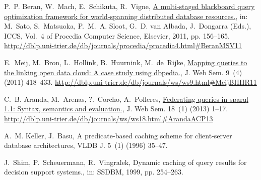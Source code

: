 \documentclass{article}
\begin{document}
\begin{thebibliography}{10}
P.~P. Beran, W.~Mach, E.~Schikuta, R.~Vigne,
  \href{http://dblp.uni-trier.de/db/journals/procedia/procedia4.html\#BeranMSV11}{A
  multi-staged blackboard query optimization framework for world-spanning
  distributed database resources.}, in: M.~Sato, S.~Matsuoka, P.~M.~A. Sloot,
  G.~D. van Albada, J.~Dongarra (Eds.), ICCS, Vol.~4 of Procedia Computer
  Science, Elsevier, 2011, pp. 156--165.
\newline\urlprefix\url{http://dblp.uni-trier.de/db/journals/procedia/procedia4.html\#BeranMSV11}

E.~Meij, M.~Bron, L.~Hollink, B.~Huurnink, M.~de~Rijke,
  \href{http://dblp.uni-trier.de/db/journals/ws/ws9.html\#MeijBHHR11}{Mapping
  queries to the linking open data cloud: A case study using dbpedia.}, J. Web
  Sem. 9~(4) (2011) 418--433.
\newline\urlprefix\url{http://dblp.uni-trier.de/db/journals/ws/ws9.html\#MeijBHHR11}

C.~B. Aranda, M.~Arenas, ?.~Corcho, A.~Polleres,
  \href{http://dblp.uni-trier.de/db/journals/ws/ws18.html\#ArandaACP13}{Federating
  queries in sparql 1.1: Syntax, semantics and evaluation.}, J. Web Sem. 18~(1)
  (2013) 1--17.
\newline\urlprefix\url{http://dblp.uni-trier.de/db/journals/ws/ws18.html\#ArandaACP13}

A.~M. Keller, J.~Basu, A predicate-based caching scheme for client-server
  database architectures, VLDB J. 5~(1) (1996) 35--47.

J.~Shim, P.~Scheuermann, R.~Vingralek, Dynamic caching of query results for
  decision support systems., in: SSDBM, 1999, pp. 254--263.

\end{thebibliography}
\end{document}
